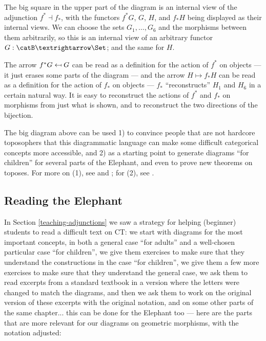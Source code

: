 \documentclass[oneside,12pt]{article}
\begin{document}
The big square in the upper part of the diagram is an internal view of
the adjunction $f^*⊣f_*$, with the functors $f^*G$, $G$, $H$, and
$f_*H$ being displayed as their internal views. We can choose the sets
$G_1, \ldots, G_6$ and the morphisms between them arbitrarily, so this
is an internal view of an arbitrary functor $G:\catB→\Set$; and the
same for $H$.

The arrow $f^*G \mapsot G$ can be read as a definition for the action
of $f^*$ on objects --- it just erases some parts of the diagram ---
and the arrow $H \mapsto f_*H$ can be read as a definition for the
action of $f_*$ on objects --- $f_*$ ``reconstructs'' $H_1$ and $H_6$
in a certain natural way. It is easy to reconstruct the actions of
$f^*$ and $f_*$ on morphisms from just what is shown, and to
reconstruct the two directions of the bijection.

The big diagram above can be used 1) to convince people that are not
hardcore toposophers that this diagrammatic language can make some
difficult categorical concepts more accessible, and 2) as a starting
point to generate diagrams ``for children'' for several parts of the
Elephant, and even to prove new theorems on toposes. For more on (1),
see \cite{OchsLucatelli} and \cite{OchsVGMS2018}; for (2), see
\cite{MDE}.



%
\subsection{Reading the Elephant \DONE}
\label{reading-the-elephant}

In Section \ref{teaching-adjunctions} we saw a strategy for helping
(beginner) students to read a difficult text on CT: we start with
diagrams for the most important concepts, in both a general case ``for
adults'' and a well-chosen particular case ``for children'', we give
them exercises to make sure that they understand the constructions in
the case ``for children'', we give them a few more exercises to make
sure that they understand the general case, we ask them to read
excerpts from a standard textbook in a version where the letters were
changed to match the diagrams, and then we ask them to work on the
original version of these excerpts with the original notation, and on
some other parts of the same chapter... this can be done for the
Elephant too --- here are the parts that are more relevant for our
diagrams on geometric morphisms, with the notation adjusted:
\end{document}
